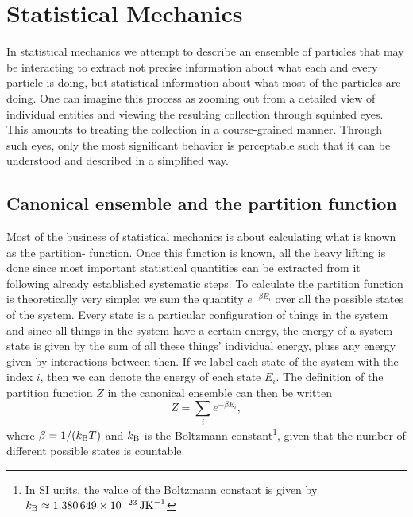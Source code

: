 \chapter{Statistical Mechanics}
\label{chap:statMech}
%
\noindent In statistical mechanics we attempt to describe an ensemble of particles that may be interacting
to extract not precise information about what each and every particle is doing, but statistical
information about what most of the particles are doing. One can imagine this process as zooming out
from a detailed view of individual entities and viewing the resulting collection through squinted eyes.
This amounts to treating the collection in a course-grained manner. Through such eyes, only the most significant
behavior is perceptable such that it can be understood and described in a simplified way.

\section{Canonical ensemble and the partition function}

Most of the business of statistical mechanics is about calculating what is known as the partition-
function. Once this function is known, all the heavy lifting is done since most important statistical
quantities can be extracted from it following already established systematic steps.
To calculate the partition function is theoretically very simple: we sum the quantity $e^{-\beta E_i}$
over all the possible states of the system. Every state is a particular configuration of things in
the system and since all things in the system have a certain energy, the energy of a system state is
given by the sum of all these things' individual energy, pluss any energy given by interactions between
then.
If we label
each state of the system with the index $i$, then we can denote the energy of each state $E_i$. The
definition of the partition function $Z$ in the canonical ensemble can then be written
\begin{equation}
    Z = \sum_i e^{-\beta E_i},
    \label{eq:statMech:partDef}
\end{equation}
where $\beta = 1/(\boltz T)$ and $\boltz$ is the Boltzmann constant\footnote{In SI units, the value of the 
Boltzmann constant is given by 
$\boltz \approx \SI{1.380649d-23}{JK^{-1}}$}, given that the number of different possible states is
countable.


